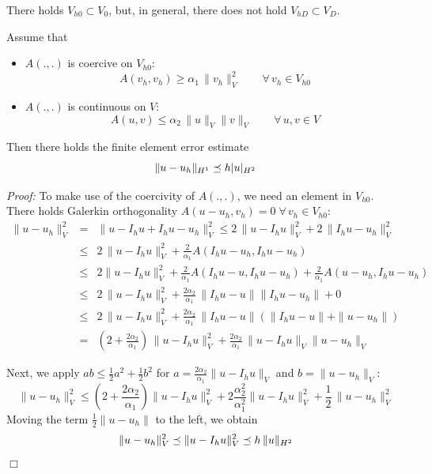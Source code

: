 There holds $V_{h0} \subset V_0$, but, in general, there does not hold $V_{hD} \subset V_D$.

\begin{theorem} Assume that 
\begin{itemize}
\item  $A(.,.)$ is coercive on $V_{h0}$:
$$
A(v_h, v_h) \geq \alpha_1 \, \| v_h \|_V^2 \qquad \forall \, v_h \in V_{h0}
$$
\item  $A(.,.)$ is continuous on $V$:
$$
A(u, v) \leq \alpha_2 \, \| u \|_V \| v \|_V \qquad \forall \, u, v \in V
$$
\end{itemize}
Then there holds the finite element error estimate
$$
\| u - u_h \|_{H^1} \preceq h | u |_{H^2}
$$
\end{theorem}
{\em Proof: } To make use of the coercivity of $A(.,.)$, we need an element in $V_{h0}$. There holds Galerkin orthogonality $A(u-u_h, v_h) = 0 \; \forall \, v_h \in V_{h0}$:
\begin{eqnarray*}
\| u - u_h \|_V^2 
        & = & \| u - I_h u + I_h u - u_h \|_V^2
          \leq 2 \, \| u - I_h u \|_V^2 + 2 \, \| I_h u - u_h \|_V^2 \\
        & \leq & 2 \, \| u - I_h u \|_V^2 + \frac{2}{\alpha_1} A(I_h u - u_h, I_h u - u_h) \\
        & \leq & 2 \| u - I_h u \|_V^2 + \frac{2}{\alpha_1} A(I_h u - u, I_h u - u_h) +  \frac{2}{\alpha_1}  A(u - u_h, I_h u - u_h) \\
        & \leq & 2 \, \| u - I_h u \|_V^2 + \frac{2 \alpha_2}{\alpha_1} \, \| I_h u - u \| \| I_h u - u_h \| + 0 \\
        & \leq & 2 \, \| u - I_h u \|_V^2 +  \frac{2 \alpha_2}{\alpha_1} \, \| I_h u - u \| ( \| I_h u - u \| + \| u - u_h \| ) \\
        & = & ( 2 + \frac{2 \alpha_2}{\alpha_1}) \, \| u - I_h u \|_V^2 +
         \frac{2 \alpha_2}{\alpha_1} \, \| u - I_h u \|_V \| u - u_h \|_V
\end{eqnarray*}

Next, we apply $a b \leq \frac{1}{2} a^2 +  \frac{1}{2} b^2$  for $a = \frac{2 \alpha_2}{\alpha_1} \| u - I_h u \|_V$ and $b = \| u - u_h \|_V$:
$$
\| u - u_h \|_V^2 \leq 
    ( 2 + \frac{2 \alpha_2}{\alpha_1}) \| u - I_h u \|_V^2 +
         2  \frac{\alpha_2^2}{\alpha_1^2}  \| u - I_h u \|_V^2 + \frac{1}{2} \, \| u - u_h \|_V^2
$$
Moving the term $\frac{1}{2} \| u - u_h \|$ to the left, we obtain
$$
\| u - u_h \|_V^2 \preceq \| u - I_h u \|_V^2 \preceq h \, \| u \|_{H^2}
$$
\hfill $\Box$

